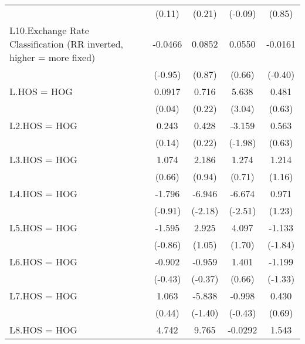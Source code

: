 {\begin{longtable}{l*{4}{c}}
                &   (0.11)         &   (0.21)         &  (-0.09)         &   (0.85)         \\
\addlinespace
L10.Exchange Rate Classification (RR inverted, higher = more fixed)&  -0.0466         &   0.0852         &   0.0550         &  -0.0161         \\
                &  (-0.95)         &   (0.87)         &   (0.66)         &  (-0.40)         \\
\addlinespace
L.HOS = HOG     &   0.0917         &    0.716         &    5.638\sym{**} &    0.481         \\
                &   (0.04)         &   (0.22)         &   (3.04)         &   (0.63)         \\
\addlinespace
L2.HOS = HOG    &    0.243         &    0.428         &   -3.159\sym{*}  &    0.563         \\
                &   (0.14)         &   (0.22)         &  (-1.98)         &   (0.63)         \\
\addlinespace
L3.HOS = HOG    &    1.074         &    2.186         &    1.274         &    1.214         \\
                &   (0.66)         &   (0.94)         &   (0.71)         &   (1.16)         \\
\addlinespace
L4.HOS = HOG    &   -1.796         &   -6.946\sym{*}  &   -6.674\sym{*}  &    0.971         \\
                &  (-0.91)         &  (-2.18)         &  (-2.51)         &   (1.23)         \\
\addlinespace
L5.HOS = HOG    &   -1.595         &    2.925         &    4.097         &   -1.133         \\
                &  (-0.86)         &   (1.05)         &   (1.70)         &  (-1.84)         \\
\addlinespace
L6.HOS = HOG    &   -0.902         &   -0.959         &    1.401         &   -1.199         \\
                &  (-0.43)         &  (-0.37)         &   (0.66)         &  (-1.33)         \\
\addlinespace
L7.HOS = HOG    &    1.063         &   -5.838         &   -0.998         &    0.430         \\
                &   (0.44)         &  (-1.40)         &  (-0.43)         &   (0.69)         \\
\addlinespace
L8.HOS = HOG    &    4.742\sym{*}  &    9.765\sym{**} &  -0.0292         &    1.543         \\

\end{longtable}}
